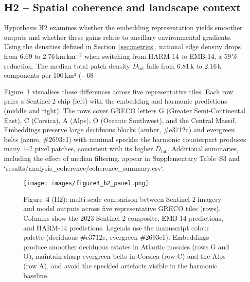 \documentclass[utf8]{FrontiersinHarvard}
\begin{document}
\subsection{H2 -- Spatial coherence and landscape context}
Hypothesis H2 examines whether the embedding representation yields smoother outputs and whether these gains relate to ancillary environmental gradients. Using the densities defined in Section~\ref{sec:metrics}, national edge density drops from 6.69 to 2.76\,km\,km\(^{-2}\) when switching from HARM-14 to EMB-14, a 59\,\% reduction. The median total patch density \(D_{\text{tot}}\) falls from 6.81\,k to 2.16\,k components per 100\,km² (−68\,%

Figure~\ref{fig:h2_multiscale} visualises these differences across five representative tiles. Each row pairs a Sentinel-2 chip (left) with the embedding and harmonic predictions (middle and right). The rows cover GRECO letters G (Greater Semi-Continental East), C (Corsica), A (Alps), O (Oceanic Southwest), and the Central Massif. Embeddings preserve large deciduous blocks (amber, \#e3712c) and evergreen belts (azure, \#2693c1) with minimal speckle; the harmonic counterpart produces many 1–2 pixel patches, consistent with its higher \(D_{\text{tot}}\). Additional summaries, including the effect of median filtering, appear in Supplementary Table~S3 and `results/analysis_coherence/coherence_summary.csv`.

\begin{figure}[H]
    \centering
    \texttt{[image: images/figure4\_h2\_panel.png]}
    \caption{Figure~4 (H2): multi-scale comparison between Sentinel-2 imagery and model outputs across five representative GRECO tiles (rows). Columns show the 2023 Sentinel-2 composite, EMB-14 predictions, and HARM-14 predictions. Legends use the manuscript colour palette (deciduous \#e3712c, evergreen \#2693c1). Embeddings produce smoother deciduous estates in Atlantic mosaics (rows G and O), maintain sharp evergreen belts in Corsica (row C) and the Alps (row A), and avoid the speckled artefacts visible in the harmonic baseline.}
    \label{fig:h2_multiscale}
\end{figure}
\end{document}
